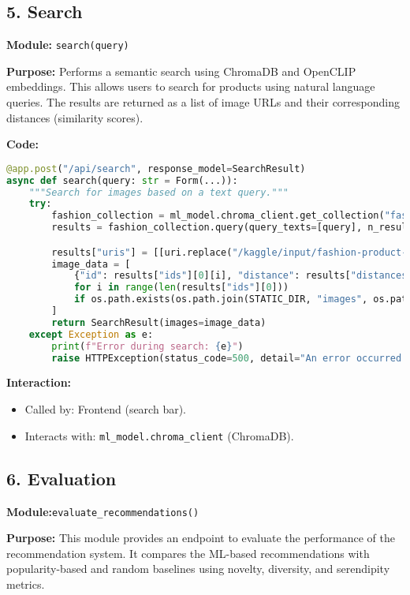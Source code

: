 \documentclass[12pt,a4paper]{article}
\begin{document}
\subsection*{5. Search}
\textbf{Module:} \texttt{search(query)}

\textbf{Purpose:}  Performs a semantic search using ChromaDB and OpenCLIP embeddings.  This allows users to search for products using natural language queries.  The results are returned as a list of image URLs and their corresponding distances (similarity scores).

\textbf{Code:}
\begin{lstlisting}[language=Python]
@app.post("/api/search", response_model=SearchResult)
async def search(query: str = Form(...)):
    """Search for images based on a text query."""
    try:
        fashion_collection = ml_model.chroma_client.get_collection("fashion", embedding_function=OpenCLIPEmbeddingFunction(), data_loader=ImageLoader())
        results = fashion_collection.query(query_texts=[query], n_results=5, include=["uris", "distances"])

        results["uris"] = [[uri.replace("/kaggle/input/fashion-product-images-dataset/fashion-dataset/", "") for uri in results["uris"][0]]]
        image_data = [
            {"id": results["ids"][0][i], "distance": results["distances"][0][i], "image_url": f"/static/images/{os.path.basename(results['uris'][0][i])}"}
            for i in range(len(results["ids"][0]))
            if os.path.exists(os.path.join(STATIC_DIR, "images", os.path.basename(results["uris"][0][i])))
        ]
        return SearchResult(images=image_data)
    except Exception as e:
        print(f"Error during search: {e}")
        raise HTTPException(status_code=500, detail="An error occurred during search")
\end{lstlisting}

\textbf{Interaction:}
\begin{itemize}
    \item Called by: Frontend (search bar).
    \item Interacts with:  \texttt{ml\_model.chroma\_client} (ChromaDB).
\end{itemize}

\subsection*{6. Evaluation}
\textbf{Module:}\texttt{evaluate\_recommendations()}

\textbf{Purpose:} This module provides an endpoint to evaluate the performance of the recommendation system.  It compares the ML-based recommendations with popularity-based and random baselines using novelty, diversity, and serendipity metrics.
\end{document}
